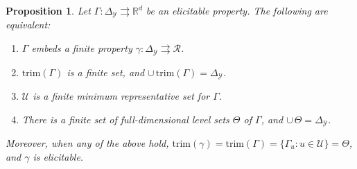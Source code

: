 \documentclass[12pt]{article}
\newcommand{\Comments}{1}
\newcommand{\mytodo}[2]{\ifnum\Comments=1%
  \todo[linecolor=#1!80!black,backgroundcolor=#1,bordercolor=#1!80!black]{#2}\fi}
\newcommand{\raft}[1]{\mytodo{green!20!white}{RF: #1}}
\newcommand{\reals}{\mathbb{R}}
\newcommand{\simplex}{\Delta_\Y}
\newcommand{\R}{\mathcal{R}}
\newcommand{\U}{\mathcal{U}}
\newcommand{\Y}{\mathcal{Y}}
\newcommand{\toto}{\rightrightarrows}
\newcommand{\trim}{\mathrm{trim}}
\newtheorem{proposition}{Proposition}
\begin{document}
\begin{proposition}\label{prop:embed-trim}
  Let $\Gamma:\simplex\toto\reals^d$ be an elicitable property.
  The following are equivalent:
  \begin{enumerate}\setlength{\itemsep}{0pt}
  \item $\Gamma$ embeds a finite property $\gamma:\simplex \toto \R$.
  \item $\trim(\Gamma)$ is a finite set, and $\cup\,\trim(\Gamma) = \simplex$.
  \item $\U$ is a finite minimum representative set for $\Gamma$.
  \item There is a finite set of full-dimensional level sets $\Theta$ of $\Gamma$, and $\cup\,\Theta = \simplex$.
  \end{enumerate}
  Moreover, when any of the above hold, $\trim(\gamma) = \trim(\Gamma) = \{\Gamma_u : u\in\U\} = \Theta$, and $\gamma$ is elicitable.
\end{proposition}
\end{document}
